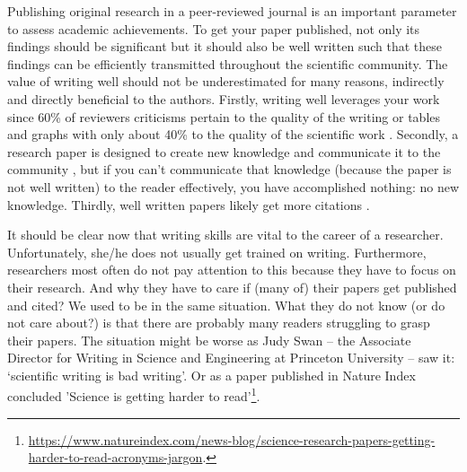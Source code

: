 \documentclass[authoryear,12pta4paper,fleqn]{article}
\numberwithin{equation}{section}
\theoremstyle{remark}
\begin{document}
Publishing original research in a peer-reviewed  journal is an important parameter to assess academic achievements. To get your paper published, not only its findings should be significant but it should also be well written such that these findings can be efficiently transmitted throughout the scientific community. The value of writing well should not be underestimated for many reasons, indirectly and directly beneficial to the authors. Firstly, writing well leverages your work since 60\% of reviewers criticisms pertain to the quality of the writing or tables and graphs with only about 40\% to the quality of the scientific work \citep{iles1997guidebook}. Secondly, a research paper is designed to create new knowledge and communicate it to the community \citep{gopen1990science}, but if you can't communicate that knowledge (because the paper is not well written) to the reader effectively, you have accomplished nothing: no new knowledge. Thirdly, well written papers likely get more citations \citep{freeling2019opinion}.


It should be clear now that writing skills are vital to the career of a researcher. Unfortunately, she/he does not usually get trained on writing. Furthermore, researchers most often do not pay attention to this because they have to focus on their research. And why they have to care if  (many of) their papers get published and cited? We used to be in the same situation.
What they do not know (or do not care about?) is that there are probably many readers struggling to grasp their papers. The situation might be worse as Judy Swan -- the Associate Director for Writing in Science and Engineering at Princeton University -- saw it: `scientific writing is bad writing'. Or as a paper published in Nature Index concluded 'Science is getting harder to read'\footnote{\url{https://www.natureindex.com/news-blog/science-research-papers-getting-harder-to-read-acronyms-jargon}.}.
\end{document}
